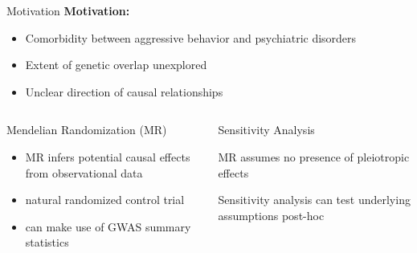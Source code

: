 \documentclass{beamer}
\begin{document}
\begin{frame}[t]{Motivation}
  \small
  \textbf{Motivation:}
  \begin{itemize}
    \item Comorbidity between aggressive behavior and psychiatric disorders 
    \item Extent of genetic overlap unexplored
    \item Unclear direction of causal relationships
  \end{itemize}
  \begin{columns}[T]
    \begin{column}[T]{0.5\textwidth}
      \begin{block}{\small Mendelian Randomization (MR)}
        \begin{itemize}
          \item MR infers potential causal effects from observational data 
          \item natural randomized control trial
          \item can make use of GWAS summary statistics
        \end{itemize}
     \end{block} 
    \end{column}
    \begin{column}[T]{0.5\textwidth}
      \begin{block}{\small Sensitivity Analysis}
      \item MR assumes no presence of pleiotropic effects
      \item Sensitivity analysis can test underlying assumptions post-hoc
      \end{block}
    \end{column}
  \end{columns}
\end{frame}
\end{document}
